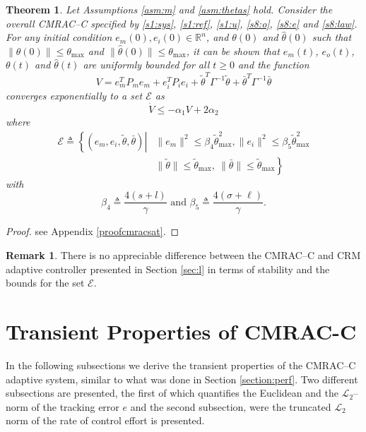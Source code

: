 \documentclass[10pt,journal]{IEEEtran}
\theoremstyle{plain}%
\newtheorem{thm}{Theorem}%
\theoremstyle{definition}
\newtheorem{rem}{Remark}
\newcommand{\be}[0]{\begin{equation}}
\newcommand{\ee}[0]{\end{equation}}
\newcommand{\ben}[0]{\begin{equation*}}
\newcommand{\een}[0]{\end{equation*}}
\newcommand{\norms}[1]{\lVert#1\rVert}
\newcommand{\normB}[0]{\norms}
\let\norm=\normB
\renewcommand{\Re}[0]{\mathbb R}
\renewcommand{\IEEEQED}{\IEEEQEDopen}
\begin{document}
\begin{thm}\label{cmracsat} Let Assumptions \ref{asm:m} and \ref{asm:thetas} hold. Consider the overall CMRAC--C specified by \eqref{s1:sys}, \eqref{s1:ref}, \eqref{s1:u},  \eqref{s8:o}, \eqref{s8:e} and \eqref{s8:law}. For any initial condition $e_m(0),e_i(0)\in \Re^n$, and $\theta(0)$ and $\hat\theta(0)$ such that $\norm{\theta(0)}\leq\theta_\text{max}$ and $\norm{\hat\theta(0)}\leq\theta_\text{max}$, it can be shown that $e_m(t)$, $e_o(t)$, $\theta(t)$ and $\hat\theta(t)$ are uniformly bounded for all $t\geq0$ and the function 
\be\label{s8:v}
V=   e_m^TP_m e_m + e_i^T P_i e_i + \tilde \theta^T\Gamma^{-1}\tilde\theta + \bar\theta^T \Gamma^{-1} \bar\theta
\ee 
converges exponentially to a set $\mathcal E$ as
\be\label{tbone3}
\dot V \leq -\alpha_1 V + 2 \alpha_2
\ee
where
\ben\begin{split}
\mathcal E \triangleq \left\{ (e_m,e_i,\tilde\theta,\bar\theta) \right | & \norm{e_m}^2  \leq \beta_4 \tilde\theta_\text{max}^2,  \norm{e_i}^2 \leq \beta_5  \tilde\theta_\text{max}^2 \\  & \left.  \norm {\tilde \theta} \leq \tilde\theta_\text{max},\ \norm {\bar \theta} \leq \tilde\theta_\text{max}\right\}
\end{split}\een
with 
\be\label{s4:b}
\beta_4 \triangleq \frac{4(s+l)}{\gamma} \text{ and } \beta_5\triangleq \frac{4(\sigma+\ell)}{\gamma}.
\ee
\end{thm}
\begin{proof}
see Appendix \ref{proofcmracsat}. \let\IEEEQED\relax  
\end{proof}


\begin{rem}
There is no appreciable difference between the CMRAC--C and CRM adaptive controller presented in Section \ref{sec:l}  in terms of stability and the bounds for the set $\mathcal E$.
\end{rem}


\section{Transient Properties of CMRAC-C}\label{section:perf2}

In the following subsections we derive the transient properties of the CMRAC--C adaptive system, similar to what was done in Section \ref{section:perf}. Two different subsections are presented, the first of which quantifies the Euclidean and the $\mathcal L_2$--norm of the tracking error $e$ and the second subsection, were the truncated $\mathcal L_2$ norm of the rate of control effort is presented. 
\end{document}
